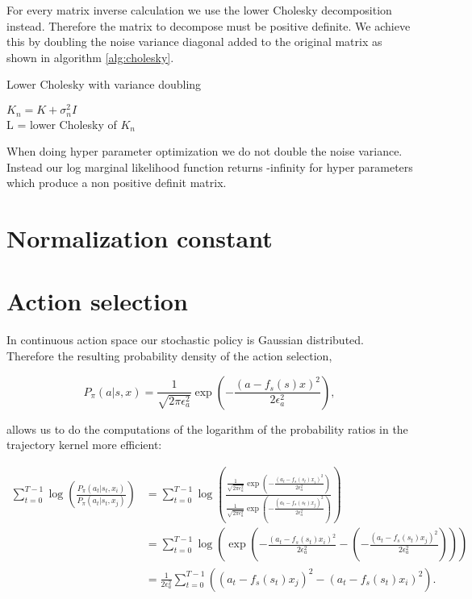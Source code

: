 For every matrix inverse calculation we use the lower Cholesky decomposition instead. Therefore the matrix to decompose must be positive definite. We achieve this by doubling the noise variance diagonal added to the original matrix as shown in algorithm \ref{alg:cholesky}.

\begin{algorithm}
    \caption{Lower Cholesky with variance doubling\label{alg:cholesky}}
    \BlankLine
    $K_n = K+\sigma_n^2 I$\\
    L = lower Cholesky of $K_n$\\
\end{algorithm}

When doing hyper parameter optimization we do not double the noise variance. Instead our log marginal likelihood function returns -infinity for hyper parameters which produce a non positive definit matrix.

\section{Normalization constant}

\section{Action selection}

In continuous action space our stochastic policy is Gaussian distributed. Therefore the resulting probability density of the action selection,

$$P_{\pi}(a|s,x) = \frac{1}{\sqrt{2\pi\epsilon_a^2}}\exp\left(-\frac{(a-f_s(s)x)^2}{2\epsilon_a^2}\right),$$

allows us to do the computations of the logarithm of the probability ratios in the trajectory kernel more efficient:

\begin{align*}
    \sum_{t=0}^{T-1} \log \left(\frac{P_{\pi}(a_{t}|s_{t},x_i)}{P_{\pi}(a_{t}|s_{t},x_j)}\right) &= \sum_{t=0}^{T-1} \log \left(\frac{\frac{1}{\sqrt{2\pi\epsilon_a^2}}\exp\left(-\frac{(a_t-f_s(s_t)x_i)^2}{2\epsilon_a^2}\right)}{\frac{1}{\sqrt{2\pi\epsilon_a^2}}\exp\left(-\frac{(a_t-f_s(s_t)x_j)^2}{2\epsilon_a^2}\right)}\right)\\
    &= \sum_{t=0}^{T-1} \log \left( \exp \left( -\frac{(a_t-f_s(s_t)x_i)^2}{2\epsilon_a^2} - \left(-\frac{(a_t-f_s(s_t)x_j)^2}{2\epsilon_a^2}\right)\right)\right)\\
    &= \frac{1}{2\epsilon_a^2} \sum_{t=0}^{T-1} \left((a_t-f_s(s_t)x_j)^2 - (a_t-f_s(s_t)x_i)^2\right).
\end{align*}




